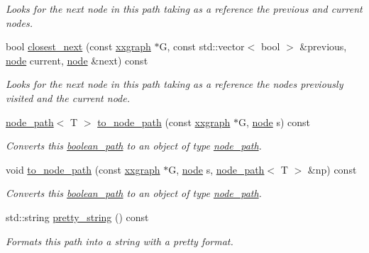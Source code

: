 \begin{DoxyCompactItemize}
\begin{DoxyCompactList}\small\item\em Looks for the next node in this path taking as a reference the {\itshape previous} and {\itshape current} nodes. \end{DoxyCompactList}\item 
bool \hyperlink{classlgraph_1_1boolean__path_a6b0bbbe3de1f5ea406b0ed9ea4624d49}{closest\+\_\+next} (const \hyperlink{classlgraph_1_1xxgraph}{xxgraph} $\ast$G, const std\+::vector$<$ bool $>$ \&previous, \hyperlink{namespacelgraph_a397169dd66adf725210a30fb7251773e}{node} current, \hyperlink{namespacelgraph_a397169dd66adf725210a30fb7251773e}{node} \&next) const
\begin{DoxyCompactList}\small\item\em Looks for the next node in this path taking as a reference the nodes previously visited and the {\itshape current} node. \end{DoxyCompactList}\item 
\hyperlink{classlgraph_1_1node__path}{node\+\_\+path}$<$ T $>$ \hyperlink{classlgraph_1_1boolean__path_a0e9a6c2a747b7b0c7ad0b7fcceefe7bf}{to\+\_\+node\+\_\+path} (const \hyperlink{classlgraph_1_1xxgraph}{xxgraph} $\ast$G, \hyperlink{namespacelgraph_a397169dd66adf725210a30fb7251773e}{node} s) const
\begin{DoxyCompactList}\small\item\em Converts this \hyperlink{classlgraph_1_1boolean__path}{boolean\+\_\+path} to an object of type \hyperlink{classlgraph_1_1node__path}{node\+\_\+path}. \end{DoxyCompactList}\item 
void \hyperlink{classlgraph_1_1boolean__path_aee896769bdb13cc9e880e948041c6a6f}{to\+\_\+node\+\_\+path} (const \hyperlink{classlgraph_1_1xxgraph}{xxgraph} $\ast$G, \hyperlink{namespacelgraph_a397169dd66adf725210a30fb7251773e}{node} s, \hyperlink{classlgraph_1_1node__path}{node\+\_\+path}$<$ T $>$ \&np) const
\begin{DoxyCompactList}\small\item\em Converts this \hyperlink{classlgraph_1_1boolean__path}{boolean\+\_\+path} to an object of type \hyperlink{classlgraph_1_1node__path}{node\+\_\+path}. \end{DoxyCompactList}\item 
std\+::string \hyperlink{classlgraph_1_1boolean__path_a5c3df2487f9c5b096d845b8d11ba0e0c}{pretty\+\_\+string} () const
\begin{DoxyCompactList}\small\item\em Formats this path into a string with a \textquotesingle{}pretty\textquotesingle{} format. \end{DoxyCompactList}\item 

\end{DoxyCompactItemize}
